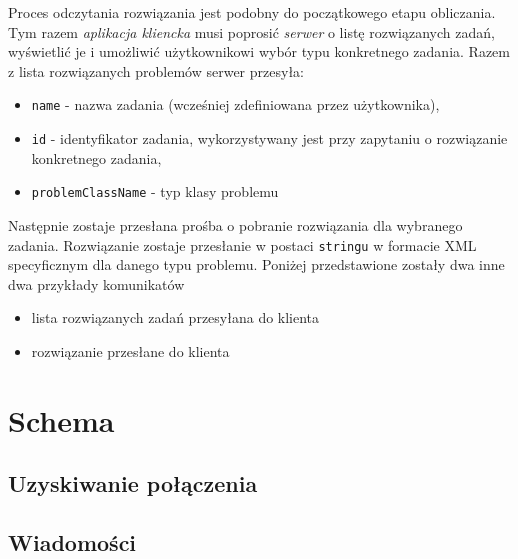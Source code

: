 \documentclass[12pt,a4paper,titlepage]{report}
\begin{document}
    Proces odczytania rozwiązania jest podobny do początkowego etapu obliczania. Tym razem \textit{aplikacja kliencka} musi poprosić \textit{serwer} o listę rozwiązanych zadań, wyświetlić je i umożliwić użytkownikowi wybór typu konkretnego zadania. 
    Razem z lista rozwiązanych problemów serwer przesyła:
    \begin{itemize}
    	\item \verb+name+ - nazwa zadania (wcześniej zdefiniowana przez użytkownika),
    	\item \verb+id+ - identyfikator zadania, wykorzystywany jest przy zapytaniu o rozwiązanie konkretnego zadania,
    	\item \verb+problemClassName+ - typ klasy problemu
    \end{itemize}
    Następnie zostaje przesłana prośba o pobranie rozwiązania dla wybranego zadania. Rozwiązanie zostaje przesłanie w postaci
    \verb+stringu+ w formacie XML specyficznym dla danego typu problemu.
    Poniżej przedstawione zostały dwa inne dwa przykłady komunikatów
    \begin{itemize}
    \item lista rozwiązanych zadań przesyłana do klienta
				
	\item rozwiązanie przesłane do klienta
				
   \end{itemize}
    
   
    
  

	\section{Schema}
		\subsection{Uzyskiwanie połączenia}
		
		\subsection{Wiadomości}
		
		
\end{document}
